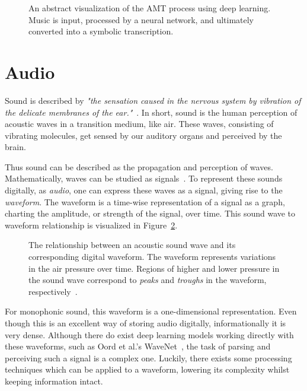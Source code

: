 \begin{figure}[H]
    \centering
    
    \caption{An abstract visualization of the \acrfull{AMT} process using deep learning. Music is input, processed by a neural network, and ultimately converted into a symbolic transcription.}
    \label{AMTFigure}
\end{figure}

\section{Audio}

Sound is described by \textit{"the sensation caused in the nervous system by vibration of the delicate membranes of the ear."}~\cite{1953fundamentals}. In short, sound is the human perception of acoustic waves in a transition medium, like air. These waves, consisting of vibrating molecules, get sensed by our auditory organs and perceived by the brain. 

Thus sound can be described as the propagation and perception of waves. Mathematically, waves can be studied as signals~\cite{8454362}. To represent these sounds digitally, as \textit{audio}, one can express these waves as a signal, giving rise to the \textit{waveform}. The waveform is a time-wise representation of a signal as a graph, charting the amplitude, or strength of the signal, over time. This sound wave to waveform relationship is visualized in Figure~\ref{WaveformFigure}.

\begin{figure}[H]
    \centering
    
    \caption{The relationship between an acoustic sound wave and its corresponding digital waveform. The waveform represents variations in the air pressure over time. Regions of higher and lower pressure in the sound wave correspond to \textit{peaks} and \textit{troughs} in the waveform, respectively~\cite{svantek2025}.}
    \label{WaveformFigure}
\end{figure}

For monophonic sound, this waveform is a one-dimensional representation. Even though this is an excellent way of storing audio digitally, informationally it is very dense. Although there do exist deep learning models working directly with these waveforms, such as Oord et al.'s WaveNet~\cite{oord2016wavenetgenerativemodelraw}, the task of parsing and perceiving such a signal is a complex one. Luckily, there exists some processing techniques which can be applied to a waveform, lowering its complexity whilst keeping information intact.

